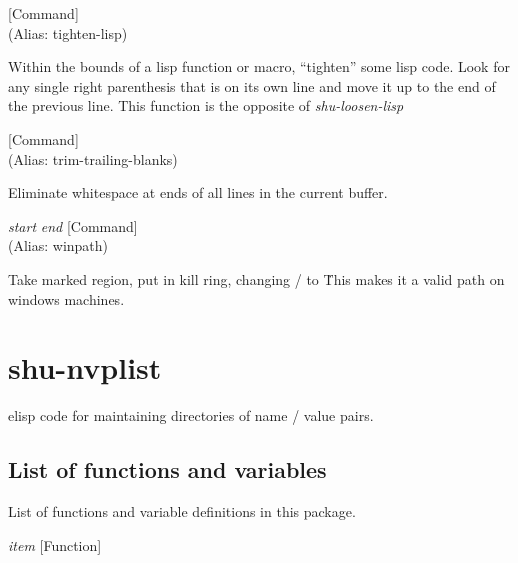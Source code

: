 \vspace{1em}
\noindent
{}
\usebox{\funcname}
 \hfill [Command]\\%
 (Alias: tighten-lisp)

\begin{doc-string}
Within the bounds of a lisp function or macro, ``tighten'' some lisp code.
Look for any single right parenthesis that is on its own line and move it up to
the end of the previous line.  This function is the opposite of \emph{shu-loosen-lisp}
\end{doc-string}

\vspace{1em}
\noindent
{}
\usebox{\funcname}
 \hfill [Command]\\%
 (Alias: trim-trailing-blanks)

\begin{doc-string}
Eliminate whitespace at ends of all lines in the current buffer.
\end{doc-string}

\vspace{1em}
\noindent
{}
\usebox{\funcname}\emph{start} \emph{end}
 \hfill [Command]\\%
 (Alias: winpath)

\begin{doc-string}
Take marked region, put in kill ring, changing / to \.
This makes it a valid path on windows machines.
\end{doc-string}

\eject
\section{shu-nvplist}


elisp code for maintaining directories of name / value pairs.


\subsection{List of functions and variables}

List of functions and variable definitions in this package.



\vspace{1em}
\noindent
{}
\usebox{\funcname}\emph{item}
 \hfill [Function]

